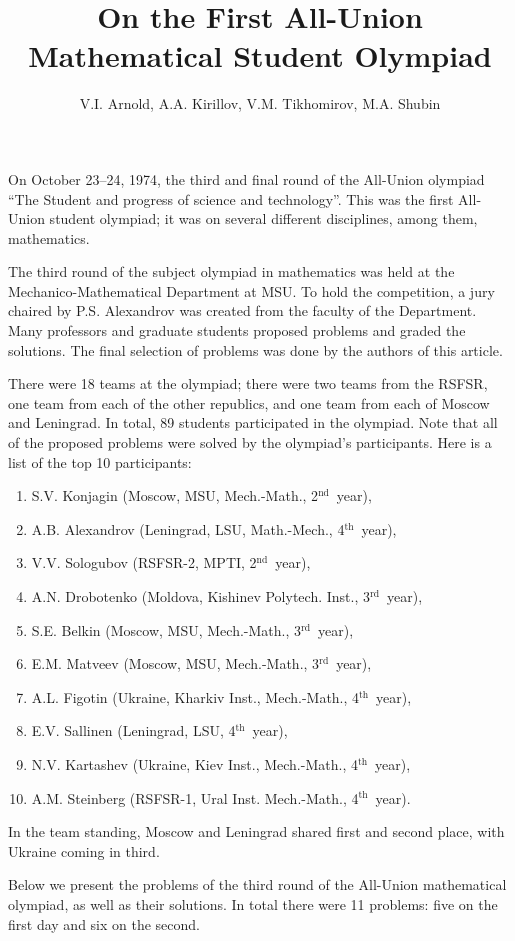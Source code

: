 \documentclass[12pt]{amsart}
\title{On the First All-Union Mathematical Student Olympiad}
\author{V.I. Arnold, A.A. Kirillov, V.M. Tikhomirov, M.A. Shubin}
\newcommand{\nd}{$^\text{nd}$~}
\newcommand{\rd}{$^\text{rd}$~}
\renewcommand{\th}{$^\text{th}$~}
\begin{document}
\maketitle
On October 23--24, 1974, the third and final round of the All-Union olympiad
``The Student and progress of science and technology''.
This was the first All-Union student olympiad; it was on several different
disciplines, among them, mathematics.

The third round of the subject olympiad in mathematics was held at the
Mechanico-Mathematical Department at MSU.
To hold the competition, a jury chaired by P.S. Alexandrov was created from the
faculty of the Department.
Many professors and graduate students proposed problems and graded the
solutions.
The final selection of problems was done by the authors of this article.

There were 18 teams at the olympiad; there were two teams from the RSFSR, one
team from each of the other republics, and one team from each of Moscow and
Leningrad.
In total, 89 students participated in the olympiad.
Note that all of the proposed problems were solved by the olympiad's
participants.
Here is a list of the top 10 participants:
\begin{enumerate}
\item
S.V. Konjagin (Moscow, MSU, Mech.-Math., 2\nd year),
\item
A.B. Alexandrov (Leningrad, LSU, Math.-Mech., 4\th year),
\item
V.V. Sologubov (RSFSR-2, MPTI, 2\nd year),
\item
A.N. Drobotenko (Moldova, Kishinev Polytech. Inst., 3\rd year),
\item
S.E. Belkin (Moscow, MSU, Mech.-Math., 3\rd year),
\item
E.M. Matveev (Moscow, MSU, Mech.-Math., 3\rd year),
\item
A.L. Figotin (Ukraine, Kharkiv Inst., Mech.-Math., 4\th year),
\item
E.V. Sallinen (Leningrad, LSU, 4\th year),
\item
N.V. Kartashev (Ukraine, Kiev Inst., Mech.-Math., 4\th year),
\item
A.M. Steinberg (RSFSR-1, Ural Inst. Mech.-Math., 4\th year).
\end{enumerate}

In the team standing, Moscow and Leningrad shared first and second place, with
Ukraine coming in third.

Below we present the problems of the third round of the All-Union mathematical
olympiad, as well as their solutions.
In total there were 11 problems: five on the first day and six on the second.\\
\end{document}
